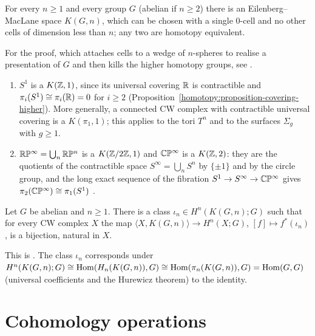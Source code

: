 \begin{theorem}\label{cohomology-operations:theorem-eilenberg-maclane-exist}
For every $n \geq 1$ and every group $G$ (abelian if $n \geq 2$) there is an Eilenberg--MacLane space $K(G, n)$, which can be chosen with a single $0$-cell and no other cells
of dimension less than $n$; any two are homotopy equivalent.
\end{theorem}

For the proof, which attaches cells to a wedge of $n$-spheres to realise a presentation of $G$ and then kills the higher homotopy groups, see \cite[Section 4.2]{hatcher-at}.

\begin{example}\label{cohomology-operations:example-eilenberg-maclane}
\begin{enumerate}
\item $S^1$ is a $K(\mathbb{Z}, 1)$, since its universal covering $\mathbb{R}$ is contractible and $\pi_i(S^1) \cong \pi_i(\mathbb{R}) = 0$ for $i \geq 2$
(Proposition~\ref{homotopy:proposition-covering-higher}). More generally, a connected CW complex with contractible universal covering is a $K(\pi_1, 1)$; this applies
to the tori $T^n$ and to the surfaces $\Sigma_g$ with $g \geq 1$.
\item $\mathbb{R}\mathbb{P}^\infty = \bigcup_n \mathbb{R}\mathbb{P}^n$ is a $K(\mathbb{Z}/2\mathbb{Z}, 1)$ and $\mathbb{C}\mathbb{P}^\infty$ is a $K(\mathbb{Z}, 2)$: they are the quotients of the contractible space
$S^\infty = \bigcup_n S^n$ by $\{\pm 1\}$ and by the circle group, and the long exact sequence of the fibration $S^1 \to S^\infty \to \mathbb{C}\mathbb{P}^\infty$ gives
$\pi_2(\mathbb{C}\mathbb{P}^\infty) \cong \pi_1(S^1)$ \cite[Section 4.2]{hatcher-at}.
\end{enumerate}
\end{example}

\begin{theorem}[Representability]\label{cohomology-operations:theorem-representability}
Let $G$ be abelian and $n \geq 1$. There is a class $\iota_n \in H^n(K(G, n); G)$ such that for every CW complex $X$ the map $\langle X, K(G, n) \rangle \to H^n(X; G)$,
$[f] \mapsto f^*(\iota_n)$, is a bijection, natural in $X$.
\end{theorem}

This is \cite[Theorem 4.57]{hatcher-at}. The class $\iota_n$ corresponds under $H^n(K(G, n); G) \cong \operatorname{Hom}(H_n(K(G, n)), G) \cong \operatorname{Hom}(\pi_n(K(G, n)), G) = \operatorname{Hom}(G, G)$
(universal coefficients and the Hurewicz theorem) to the identity.

\section{Cohomology operations}\label{cohomology-operations:section-operations}

